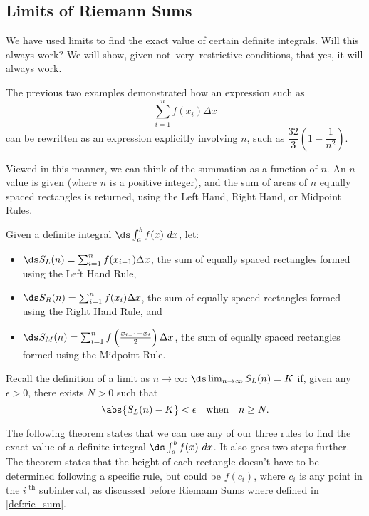 \subsection*{Limits of Riemann Sums}

We have used limits to find the exact value of certain definite integrals. Will this always work? We will show, given not--very--restrictive conditions, that yes, it will always work.

The previous two examples demonstrated how an expression such as
\[\sum_{i=1}^n f(x_i)\Delta x\]
can be rewritten as an expression explicitly involving $n$, such as $\dfrac{32}3(1-\dfrac1{n^2})$.

Viewed in this manner, we can think of the summation as a function of $n$. An $n$ value is given (where $n$ is a positive integer), and the sum of areas of $n$ equally spaced rectangles is returned, using the Left Hand, Right Hand, or Midpoint Rules. 

Given a definite integral $\ds\int_a^b f(x)\ dx$, let:
\begin{itemize}
	\item	$\ds S_L(n) = \sum_{i=1}^n f(x_{i-1})\Delta x$, the sum of equally spaced rectangles formed using the Left Hand Rule,
	\item	$\ds S_R(n) = \sum_{i=1}^n f(x_i)\Delta x$, the sum of equally spaced rectangles formed using the Right Hand Rule, and
	\item	$\ds S_M(n) = \sum_{i=1}^n f\left(\frac{x_{i-1}+x_i}{2}\right)\Delta x$, the sum of equally spaced rectangles formed using the Midpoint Rule.
\end{itemize}
	
Recall the definition of a limit as $n\to\infty$: $\ds\lim_{n\to\infty}S_L(n) = K$ if, given any $\epsilon>0$, there exists $N>0$ such that
\[\abs{S_L(n)-K}< \epsilon \quad \text{when}\quad n\geq N.\]

The following theorem states that we can use any of our three rules to find the exact value of a definite integral $\ds\int_a^b f(x)\ dx$. It also goes two steps further. The theorem states that the height of each rectangle doesn't have to be determined following a specific rule, but could be $f(c_i)$, where $c_i$ is any point in the $i^\text{ th}$ subinterval, as discussed before Riemann Sums where defined in \autoref{def:rie_sum}.

